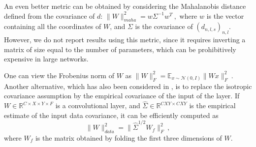 An even better metric can be obtained by considering the Mahalanobis distance defined from the covariance of 
$d$: $\| W \|_{maha}^2 = w \Sigma^{-1} w^T~,$
where $w$ is the vector containing all the coordinates of $W$, and $\Sigma$ is the covariance of $(d_{n,l,s})_{n,l}$. 
However, we do not report results using this metric, since it requires inverting a matrix of size equal to the number 
of parameters, which can be prohibitively expensive in large networks.

One can view the Frobenius norm of $W$ as
$\| W \|_F^2 = \mathbb{E}_{x \sim \mathcal{N}(0,I)} \| W x \|_F^2 ~.$
Another alternative, which has also been considered in \cite{zisserman14}, is to replace the isotropic covariance
assumption by the empirical covariance of the input of the layer. If $W \in \mathbb{R}^{C \times X \times Y \times F}$ 
is a convolutional layer, and $\widehat{\Sigma} \in \mathbb{R}^{CXY \times CXY}$ is the empirical estimate of the input data covariance, 
it can be efficiently computed as 
\begin{equation}
\| W \|_{data}^2 = \| \widehat{\Sigma}^{1/2} W_f \|_F^2~, 
\end{equation}
where $W_f$ is the matrix obtained by folding the first three dimensions of $W$.

%
%

